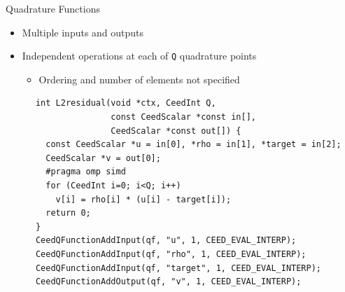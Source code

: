 \documentclass[aspectratio=1610]{beamer}
\begin{document}
\begin{frame}[fragile]{Quadrature Functions}
  \begin{itemize}
  \item Multiple inputs and outputs
  \item Independent operations at each of \texttt{Q} quadrature points
    \begin{itemize}
    \item Ordering and number of elements not specified
    \end{itemize}
  \end{itemize}
  \begin{minipage}{0.5\textwidth}
    \begin{verbatim}
      int L2residual(void *ctx, CeedInt Q,
                     const CeedScalar *const in[],
                     CeedScalar *const out[]) {
        const CeedScalar *u = in[0], *rho = in[1], *target = in[2];
        CeedScalar *v = out[0];
        #pragma omp simd
        for (CeedInt i=0; i<Q; i++)
          v[i] = rho[i] * (u[i] - target[i]);
        return 0;
      }
      CeedQFunctionAddInput(qf, "u", 1, CEED_EVAL_INTERP);
      CeedQFunctionAddInput(qf, "rho", 1, CEED_EVAL_INTERP);
      CeedQFunctionAddInput(qf, "target", 1, CEED_EVAL_INTERP);
      CeedQFunctionAddOutput(qf, "v", 1, CEED_EVAL_INTERP);
    \end{verbatim}
  \end{minipage}
\end{frame}
\end{document}
